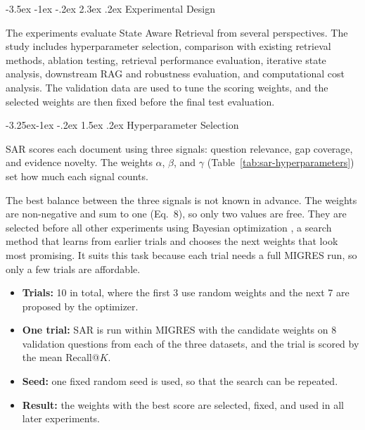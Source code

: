 \documentclass[12pt,a4paper]{report}
\makeatletter
\renewcommand\section{\@startsection{section}{1}{\z@}%
    {-3.5ex \@plus -1ex \@minus -.2ex}%
    {2.3ex \@plus.2ex}%
    {\normalfont\fontsize{16}{19}\selectfont\bfseries}}
\renewcommand\subsection{\@startsection{subsection}{2}{\z@}%
    {-3.25ex\@plus -1ex \@minus -.2ex}%
    {1.5ex \@plus .2ex}%
    {\normalfont\fontsize{14}{17}\selectfont\bfseries}}
\makeatother
\begin{document}
\clearpage
\section{Experimental Design}

The experiments evaluate State Aware Retrieval from several perspectives. The study includes hyperparameter selection, comparison with existing retrieval methods, ablation testing, retrieval performance evaluation, iterative state analysis, downstream RAG and robustness evaluation, and computational cost analysis. The validation data are used to tune the scoring weights, and the selected weights are then fixed before the final test evaluation.

\subsection{Hyperparameter Selection}

SAR scores each document using three signals: question relevance, gap coverage, and evidence novelty. The weights $\alpha$, $\beta$, and $\gamma$ (Table~\ref{tab:sar-hyperparameters}) set how much each signal counts.

The best balance between the three signals is not known in advance. The weights are non-negative and sum to one (Eq.~8), so only two values are free. They are selected before all other experiments using Bayesian optimization \cite{snoek2012practical}, a search method that learns from earlier trials and chooses the next weights that look most promising. It suits this task because each trial needs a full MIGRES run, so only a few trials are affordable.

\begin{itemize}[leftmargin=0.25in,itemsep=0.06in,parsep=0pt]
\item \textbf{Trials:} 10 in total, where the first 3 use random weights and the next 7 are proposed by the optimizer.
\item \textbf{One trial:} SAR is run within MIGRES with the candidate weights on 8 validation questions from each of the three datasets, and the trial is scored by the mean Recall@$K$.
\item \textbf{Seed:} one fixed random seed is used, so that the search can be repeated.
\item \textbf{Result:} the weights with the best score are selected, fixed, and used in all later experiments.
\end{itemize}
\end{document}
